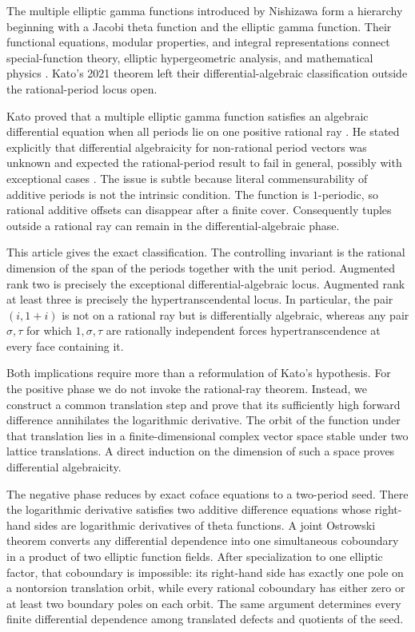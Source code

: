 \documentclass[11pt]{article}
\numberwithin{equation}{section}
\theoremstyle{definition}
\theoremstyle{remark}
\begin{document}
The multiple elliptic gamma functions introduced by Nishizawa
\cite{Nishizawa2001} form a hierarchy beginning with a Jacobi theta function
and the elliptic gamma function.  Their functional equations, modular
properties, and integral representations connect special-function theory,
elliptic hypergeometric analysis, and mathematical physics
\cite{FelderVarchenko2000,Narukawa2004}.  Kato's 2021 theorem left their
differential-algebraic classification outside the rational-period locus
open.

Kato proved that a multiple elliptic gamma function satisfies an algebraic
differential equation when all periods lie on one positive rational ray
\cite[Theorem~1.1]{Kato2021}.  He stated explicitly that differential
algebraicity for non-rational period vectors was unknown and expected the
rational-period result to fail in general, possibly with exceptional cases
\cite[Remark~1.2]{Kato2021}.  The issue is subtle because literal
commensurability of additive periods is not the intrinsic condition.  The
function is $1$-periodic, so rational additive offsets can disappear after a
finite cover.  Consequently tuples outside a rational ray can remain in the
differential-algebraic phase.

This article gives the exact classification.  The controlling invariant is
the rational dimension of the span of the periods together with the unit
period.  Augmented rank two is precisely the exceptional
differential-algebraic locus.  Augmented rank at least three is precisely the
hypertranscendental locus.  In particular, the pair $(i,1+i)$ is not on a
rational ray but is differentially algebraic, whereas any pair $\sigma,\tau$
for which $1,\sigma,\tau$ are rationally independent forces
hypertranscendence at every face containing it.

Both implications require more than a reformulation of Kato's hypothesis.
For the positive phase we do not invoke the rational-ray theorem.  Instead,
we construct a common translation step and prove that its sufficiently high
forward difference annihilates the logarithmic derivative.  The orbit of the
function under that translation lies in a finite-dimensional complex vector
space stable under two lattice translations.  A direct induction on the
dimension of such a space proves differential algebraicity.

The negative phase reduces by exact coface equations to a two-period seed.
There the logarithmic derivative satisfies two additive difference equations
whose right-hand sides are logarithmic derivatives of theta functions.  A
joint Ostrowski theorem converts any differential dependence into one
simultaneous coboundary in a product of two elliptic function fields.  After
specialization to one elliptic factor, that coboundary is impossible: its
right-hand side has exactly one pole on a nontorsion translation orbit, while
every rational coboundary has either zero or at least two boundary poles on
each orbit.  The same argument determines every finite differential
dependence among translated defects and quotients of the seed.
\end{document}
